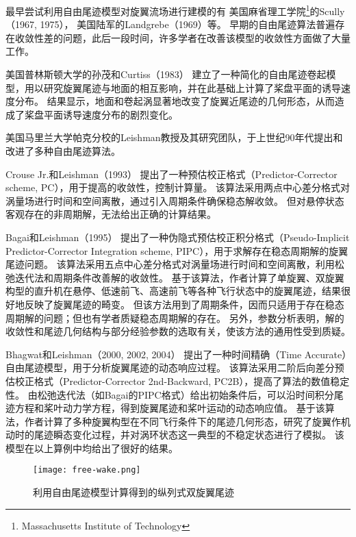\documentclass[doctor,openright,twoside,color]{buaathesis}
\begin{document}
最早尝试利用自由尾迹模型对旋翼流场进行建模的有
美国麻省理工学院\footnote{Massachusetts Institute of Technology}的Scully（1967, 1975），
美国陆军的Landgrebe（1969）等。
早期的自由尾迹算法普遍存在收敛性差的问题，此后一段时间，许多学者在改善该模型的收敛性方面做了大量工作。

美国普林斯顿大学的孙茂和Curtiss（1983）
建立了一种简化的自由尾迹卷起模型，用以研究旋翼尾迹与地面的相互影响，并在此基础上计算了桨盘平面的诱导速度分布。
结果显示，地面和卷起涡显著地改变了旋翼近尾迹的几何形态，从而造成了桨盘平面诱导速度分布的剧烈变化。

美国马里兰大学帕克分校的Leishman教授及其研究团队，于上世纪90年代提出和改进了多种自由尾迹算法。

Crouse Jr.和Leishman（1993）
提出了一种预估校正格式（Predictor-Corrector scheme, PC），用于提高的收敛性，控制计算量。
该算法采用两点中心差分格式对涡量场进行时间和空间离散，通过引入周期条件确保稳态解收敛。
但对悬停状态客观存在的非周期解，无法给出正确的计算结果。

Bagai和Leishman（1995）
提出了一种伪隐式预估校正积分格式（Pseudo-Implicit Predictor-Corrector Integration scheme, PIPC），用于求解存在稳态周期解的旋翼尾迹问题。
该算法采用五点中心差分格式对涡量场进行时间和空间离散，利用松弛迭代法和周期条件改善解的收敛性。
基于该算法，作者计算了单旋翼、双旋翼构型的直升机在悬停、低速前飞、高速前飞等各种飞行状态中的旋翼尾迹，结果很好地反映了旋翼尾迹的畸变。
但该方法用到了周期条件，因而只适用于存在稳态周期解的问题；但也有学者质疑稳态周期解的存在。
另外，参数分析表明，解的收敛性和尾迹几何结构与部分经验参数的选取有关，使该方法的通用性受到质疑。

Bhagwat和Leishman（2000, 2002, 2004）
提出了一种时间精确（Time Accurate）自由尾迹模型，用于分析旋翼尾迹的动态响应过程。
该算法采用二阶后向差分预估校正格式（Predictor-Corrector 2nd-Backward, PC2B），提高了算法的数值稳定性。
由松弛迭代法（如Bagai的PIPC格式）给出初始条件后，可以沿时间积分尾迹方程和桨叶动力学方程，得到旋翼尾迹和桨叶运动的动态响应值。
基于该算法，作者计算了多种旋翼构型在不同飞行条件下的尾迹几何形态，研究了旋翼作机动时的尾迹瞬态变化过程，并对涡环状态这一典型的不稳定状态进行了模拟。
该模型在以上算例中均给出了很好的结果。
\begin{figure}[t!]
    \centering
    \texttt{[image: free-wake.png]}
    \caption{利用自由尾迹模型计算得到的纵列式双旋翼尾迹}\label{free-wake}
\end{figure}
\end{document}

